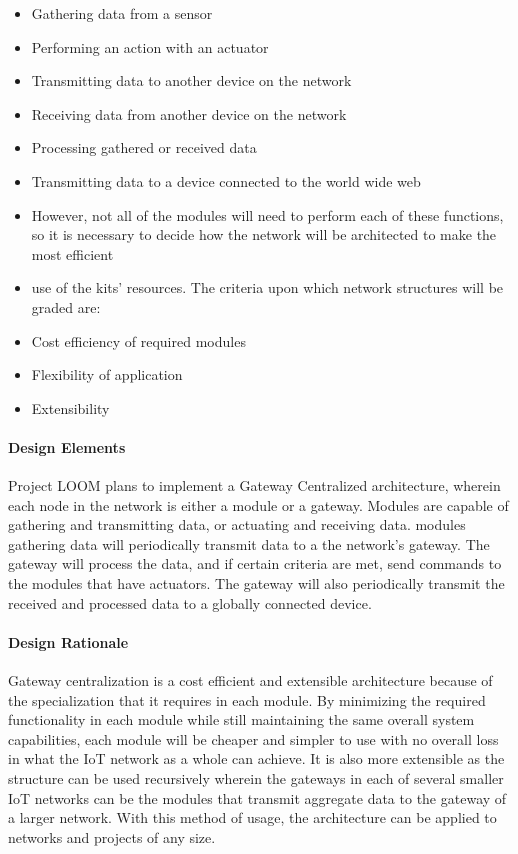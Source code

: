 \documentclass[onecolumn, draftclsnofoot,10pt, compsoc]{IEEEtran}
\begin{document}
    \begin{itemize}[noitemsep,topsep=-10pt]
        \item Gathering data from a sensor
        \item Performing an action with an actuator
        \item Transmitting data to another device on the network
        \item Receiving data from another device on the network
        \item Processing gathered or received data
        \item Transmitting data to a device connected to the world wide web
        \item However, not all of the modules will need to perform each of these functions, so it is necessary to decide how the network will be architected to make the most efficient
        \item use of the kits' resources. The criteria upon which network structures will be graded are: 
        \item Cost efficiency of required modules
        \item Flexibility of application
        \item Extensibility
    \end{itemize}

\paragraph{Design Elements}
    Project LOOM plans to implement a Gateway Centralized architecture, wherein each node in the network is either a module or a gateway. Modules are capable of gathering and transmitting data, or actuating and receiving data. modules gathering data will periodically transmit data to a the network's gateway. The gateway will process the data, and if certain criteria are met, send commands to the modules that have actuators. The gateway will also periodically transmit the received and processed data to a globally connected device. 

\paragraph{Design Rationale}
    Gateway centralization is a cost efficient and extensible architecture because of the specialization that it requires in each module. By minimizing the required functionality in each module while still maintaining the same overall system capabilities, each module will be cheaper and simpler to use with no overall loss in what the IoT network as a whole can achieve. It is also more extensible as the structure can be used recursively wherein the gateways in each of several smaller IoT networks can be the modules that transmit aggregate data to the gateway of a larger network. With this method of usage, the architecture can be applied to networks and projects of any size.
\end{document}
